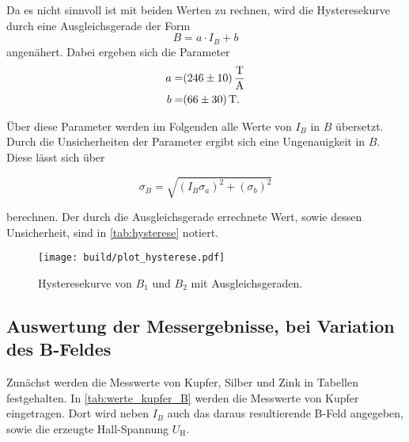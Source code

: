 Da es nicht sinnvoll ist mit beiden Werten zu rechnen, wird die Hysteresekurve durch eine Ausgleichsgerade der Form
\begin{equation}
    B = a \cdot I_B + b
    \label{eq:gerade}
\end{equation}
angenähert.
Dabei ergeben sich die Parameter
\begin{align}
    a =& \SI{246+-10}{\tesla\per\ampere} \\
    b =& \SI{66+-30}{\tesla}.
    \label{eq:params1}
\end{align}

Über diese Parameter werden im Folgenden alle Werte von $I_B$ in $B$ übersetzt.
Durch die Unsicherheiten der Parameter ergibt sich eine Ungenauigkeit in $B$.
Diese lässt sich über

\begin{equation}
    \sigma _B = \sqrt{\left(I_B \sigma _a \right)^2 + \left(\sigma _b \right)^2}
    \label{eq:B_fehler}
\end{equation}

berechnen.
Der durch die Ausgleichsgerade errechnete Wert, sowie dessen Unsicherheit, sind in \autoref{tab:hysterese} notiert.

\begin{figure}
    \centering
    \texttt{[image: build/plot\_hysterese.pdf]}
    \caption{Hysteresekurve von $B_1$ und $B_2$ mit Ausgleichsgeraden.\cite{numpy}}
    \label{fig:hysterese_plot}
\end{figure}

\subsection{Auswertung der Messergebnisse, bei Variation des B-Feldes}
\label{ssec:mess}

Zunächst werden die Messwerte von Kupfer, Silber und Zink in Tabellen festgehalten.
In \autoref{tab:werte_kupfer_B} werden die Messwerte von Kupfer eingetragen.
Dort wird neben $I_B$ auch das daraus resultierende B-Feld angegeben, sowie die erzeugte Hall-Spannung $U_\text{H}$.

